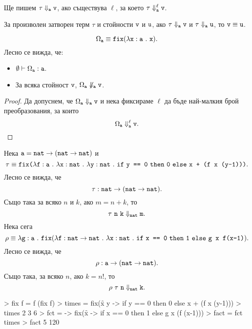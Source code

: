 \begin{prooftree}
\end{prooftree}

Ще пишем $\tau \Downarrow_{\vv{a}} \vv{v}$, ако съществува $\ell$, за което $\tau \Downarrow^\ell_{\vv{a}} \vv{v}$.


\begin{lemma}
  За произволен затворен терм $\tau$ и стойности $\vv{v}$ и $\vv{u}$,
  ако $\tau \Downarrow_{\vv{a}} \vv{v}$ и $\tau \Downarrow_{\vv{a}} \vv{u}$, то $\vv{v} \equiv \vv{u}$.
\end{lemma}

\begin{example}
  \[\Omega_{\vv{a}} \equiv \fix(\lamb{x}{a}{\vv{x}}).\]
  Лесно се вижда, че:
  \begin{itemize}
  \item
    $\emptyset \vdash \Omega_{\vv{a}} : \vv{a}$.
  \item
    За всяка стойност $\vv{v}$,
    $\Omega_{\vv{a}} \not\Downarrow_{\vv{a}} \vv{v}$.
  \end{itemize}
\end{example}
\begin{proof}
  Да допуснем, че $\Omega_{\vv{a}} \Downarrow_{\vv{a}} \vv{v}$ и нека фиксираме $\ell$
  да бъде най-малкия брой преобразования, за които
  \[\Omega_{\vv{a}} \Downarrow^{\ell}_{\vv{a}} \vv{v}.\]
\end{proof}


\begin{example}
  Нека $\vv{a} = \vv{nat} \to (\vv{nat} \to \vv{nat})$ и 
  \[\tau \equiv \fix\vv{(}\lamb{f}{a}{\lamb{x}{nat}{\lamb{y}{nat}{\ifelse{\vv{y == 0}}{\vv{0}}{\vv{x + (f x (y-1))} }}}}\vv{)}.\]
  Лесно се вижда, че
  \[\tau:\vv{nat} \to (\vv{nat} \to \vv{nat}).\]
  Също така за всяко $n$ и $k$, ако $m = n + k$, то
  \[\tau\ \vv{n}\ \vv{k} \Downarrow_{\vv{nat}} \vv{m}.\]
  Нека сега
  \[\rho \equiv \lamb{g}{a}{\fix(\lambda \vv{f} : \vv{nat}\to\vv{nat}\ .\ \lamb{x}{nat}{\ifelse{\vv{x == 0}}{\vv{1}}{\vv{g x f(x-1)}}}}).\]
  Лесно се вижда, че
  \[ \rho : \vv{a} \to (\vv{nat} \to \vv{nat}).\]
  Също така, за всяко $n$, ако $k = n!$, то
  \[ \rho\ \tau\ \vv{n} \Downarrow_{\vv{nat}} \vv{k}.\]
\end{example}

\begin{haskellcode}
> fix f = f (fix f)
> times = fix(\f x y -> if y == 0 then 0 else x + (f x (y-1)))
> times 2 3
6
> fct = \g -> fix(\f x -> if x == 0 then 1 else g x (f (x-1)))
> fact = fct times
> fact 5
120
\end{haskellcode}

